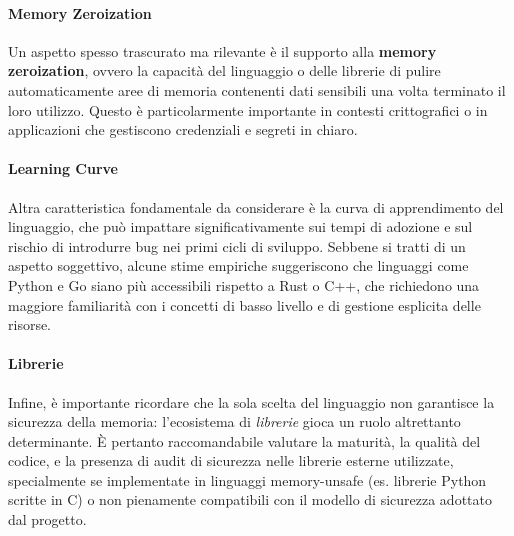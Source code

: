 \paragraph{Memory Zeroization}
Un aspetto spesso trascurato ma rilevante è il supporto alla \textbf{memory
zeroization}, ovvero la capacità del linguaggio o delle librerie di pulire
automaticamente aree di memoria contenenti dati sensibili una volta terminato il
loro utilizzo. Questo è particolarmente importante in contesti crittografici o in
applicazioni che gestiscono credenziali e segreti in chiaro.

\paragraph{Learning Curve}
Altra caratteristica fondamentale da considerare è la curva di apprendimento del
linguaggio, che può impattare significativamente sui tempi di adozione e sul rischio
di introdurre bug nei primi cicli di sviluppo. Sebbene si tratti di un aspetto
soggettivo, alcune stime empiriche\cite{learning_curves} suggeriscono che
linguaggi come Python e Go siano più accessibili rispetto a Rust o C++, che richiedono
una maggiore familiarità con i concetti di basso livello e di gestione esplicita
delle risorse.

\paragraph{Librerie}
Infine, è importante ricordare che la sola scelta del linguaggio non garantisce la
sicurezza della memoria: l'ecosistema di \textit{librerie} gioca un ruolo altrettanto
determinante. È pertanto raccomandabile valutare la maturità, la qualità del codice,
e la presenza di audit di sicurezza nelle librerie esterne utilizzate, specialmente
se implementate in linguaggi memory-unsafe (es. librerie Python scritte in C) o
non pienamente compatibili con il modello di sicurezza adottato dal progetto.
